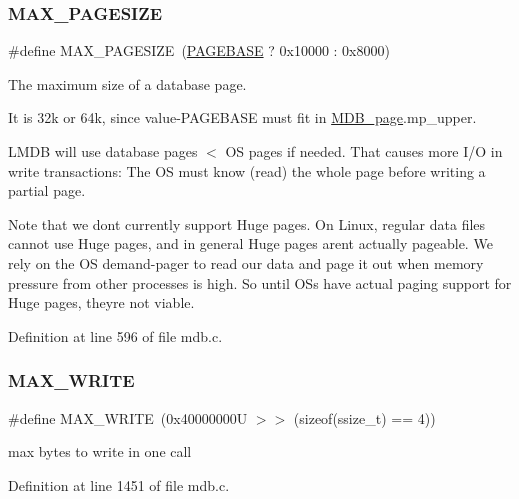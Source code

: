\subsubsection{\texorpdfstring{M\+A\+X\+\_\+\+P\+A\+G\+E\+S\+I\+ZE}{MAX\_PAGESIZE}}
{\footnotesize\ttfamily \#define M\+A\+X\+\_\+\+P\+A\+G\+E\+S\+I\+ZE~(\mbox{\hyperlink{group__internal_ga42d35f5d5bf3f161dc064ac7f78a2838}{P\+A\+G\+E\+B\+A\+SE}} ? 0x10000 \+: 0x8000)}



The maximum size of a database page. 

It is 32k or 64k, since value-\/\+P\+A\+G\+E\+B\+A\+SE must fit in \mbox{\hyperlink{struct_m_d_b__page}{M\+D\+B\+\_\+page}}.mp\+\_\+upper.

L\+M\+DB will use database pages $<$ OS pages if needed. That causes more I/O in write transactions\+: The OS must know (read) the whole page before writing a partial page.

Note that we don\textquotesingle{}t currently support Huge pages. On Linux, regular data files cannot use Huge pages, and in general Huge pages aren\textquotesingle{}t actually pageable. We rely on the OS demand-\/pager to read our data and page it out when memory pressure from other processes is high. So until O\+Ss have actual paging support for Huge pages, they\textquotesingle{}re not viable. 

Definition at line 596 of file mdb.\+c.

\mbox{\label{group__internal_ga6ca75cdd9d6e5a1b941ba35c50a77886}} 
\subsubsection{\texorpdfstring{M\+A\+X\+\_\+\+W\+R\+I\+TE}{MAX\_WRITE}}
{\footnotesize\ttfamily \#define M\+A\+X\+\_\+\+W\+R\+I\+TE~(0x40000000\+U $>$$>$ (sizeof(ssize\+\_\+t) == 4))}

max bytes to write in one call 

Definition at line 1451 of file mdb.\+c.

\mbox{\label{group__internal_ga16c16f9369be4a374a3e621f6d13bb16}} 
